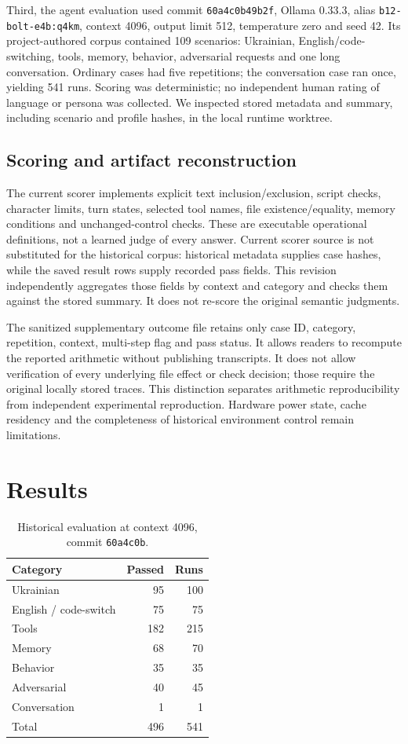 \documentclass[11pt]{article}
\begin{document}
Third, the agent evaluation used commit \texttt{60a4c0b49b2f}, Ollama 0.33.3, alias \texttt{b12-bolt-e4b:q4km}, context 4096, output limit 512, temperature zero and seed 42. Its project-authored corpus contained 109 scenarios: Ukrainian, English/code-switching, tools, memory, behavior, adversarial requests and one long conversation. Ordinary cases had five repetitions; the conversation case ran once, yielding 541 runs. Scoring was deterministic; no independent human rating of language or persona was collected. We inspected stored metadata and summary, including scenario and profile hashes, in the local runtime worktree.


\subsection{Scoring and artifact reconstruction}
The current scorer implements explicit text inclusion/exclusion, script checks, character limits, turn states, selected tool names, file existence/equality, memory conditions and unchanged-control checks. These are executable operational definitions, not a learned judge of every answer. Current scorer source is not substituted for the historical corpus: historical metadata supplies case hashes, while the saved result rows supply recorded pass fields. This revision independently aggregates those fields by context and category and checks them against the stored summary. It does not re-score the original semantic judgments.

The sanitized supplementary outcome file retains only case ID, category, repetition, context, multi-step flag and pass status. It allows readers to recompute the reported arithmetic without publishing transcripts. It does not allow verification of every underlying file effect or check decision; those require the original locally stored traces. This distinction separates arithmetic reproducibility from independent experimental reproduction. Hardware power state, cache residency and the completeness of historical environment control remain limitations.

\section{Results}
\begin{table}[ht]
\centering
\begin{tabular}{lrr}
\toprule
Category & Passed & Runs\\
\midrule
Ukrainian & 95 & 100\\
English / code-switch & 75 & 75\\
Tools & 182 & 215\\
Memory & 68 & 70\\
Behavior & 35 & 35\\
Adversarial & 40 & 45\\
Conversation & 1 & 1\\
\midrule
Total & 496 & 541\\
\bottomrule
\end{tabular}
\caption{Historical evaluation at context 4096, commit \texttt{60a4c0b}.}\label{tab:historical}
\end{table}
\end{document}
